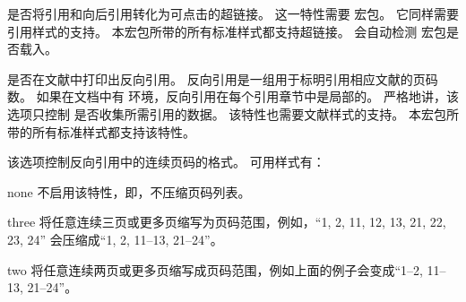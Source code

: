 \begin{optionlist}
是否将引用和向后引用转化为可点击的超链接。
这一特性需要  宏包。
它同样需要引用样式的支持。
本宏包所带的所有标准样式都支持超链接。
 会自动检测  宏包是否载入。



是否在文献中打印出反向引用。
反向引用是一组用于标明引用相应文献的页码数。
如果在文档中有  环境，反向引用在每个引用章节中是局部的。
严格地讲，该选项只控制 \biblatex 是否收集所需引用的数据。
该特性也需要文献样式的支持。
本宏包所带的所有标准样式都支持该特性。



该选项控制反向引用中的连续页码的格式。
可用样式有：

\begin{valuelist}

\item[none] %
不启用该特性，即，不压缩页码列表。

\item[three] %
将任意连续三页或更多页缩写为页码范围，例如，“1, 2, 11, 12, 13, 21, 22, 23, 24” 会压缩成“1, 2, 11--13, 21--24”。

\item[two] %
将任意连续两页或更多页缩写成页码范围，例如上面的例子会变成“1--2, 11--13, 21--24”。


\end{valuelist}
\end{optionlist}
